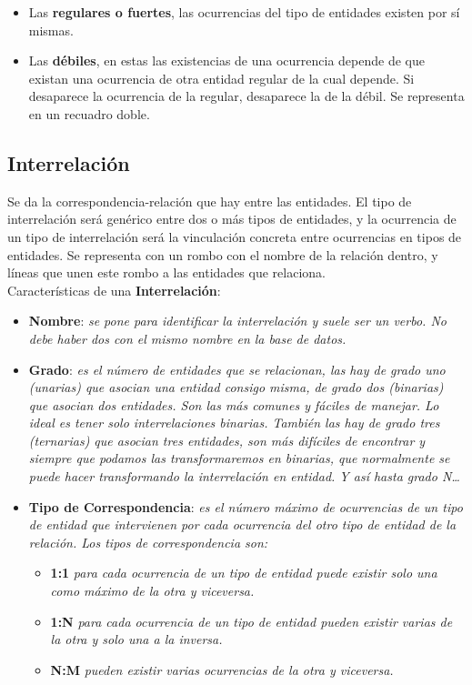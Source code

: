 \documentclass{article}
\begin{document}
\begin{itemize}
    \item Las \textbf{regulares o fuertes}, las ocurrencias del tipo de entidades existen por sí mismas.
    \item Las \textbf{débiles}, en estas las existencias de una ocurrencia depende de que existan una ocurrencia de otra entidad regular de la cual depende. 
    Si desaparece la ocurrencia de la regular, desaparece la de la débil. Se representa en un recuadro doble.
\end{itemize}

\subsection{Interrelación}
Se da la correspondencia-relación que hay entre las entidades. El tipo de interrelación será genérico entre dos o más tipos de entidades, y la ocurrencia de 
un tipo de interrelación será la vinculación concreta entre ocurrencias en tipos de entidades. Se representa con un rombo con el nombre de la relación dentro, 
y líneas que unen este rombo a las entidades que relaciona.
\\
Características de una \textbf{Interrelación}:

\begin{itemize}

    \item \textbf{Nombre}: \textit{se pone para identificar la interrelación y suele ser un verbo. No debe haber dos con el mismo nombre en la base de datos.}
    \item \textbf{Grado}: \textit{es el número de entidades que se relacionan, las hay de grado uno (unarias) que asocian una entidad consigo misma, de grado 
    dos (binarias) que asocian dos entidades. Son las más comunes y fáciles de manejar. Lo ideal es tener solo interrelaciones binarias. También las hay de 
    grado tres (ternarias) que asocian tres entidades, son más difíciles de encontrar y siempre que podamos las transformaremos en binarias, que normalmente 
    se puede hacer transformando la interrelación en entidad. Y así hasta grado N…}
    \item \textbf{Tipo de Correspondencia}: \textit{es el número máximo de ocurrencias de un tipo de entidad que intervienen por cada ocurrencia del otro tipo 
    de entidad de la relación. Los tipos de correspondencia son:}

    \begin{itemize}
        \item \textbf{1:1} \textit{para cada ocurrencia de un tipo de entidad puede existir solo una como máximo de la otra y viceversa.}
        \item \textbf{1:N} \textit{para cada ocurrencia de un tipo de entidad pueden existir varias de la otra y solo una a la inversa.}
        \item \textbf{N:M} \textit{pueden existir varias ocurrencias de la otra y viceversa.}
    \end{itemize}

\end{itemize}
\end{document}
